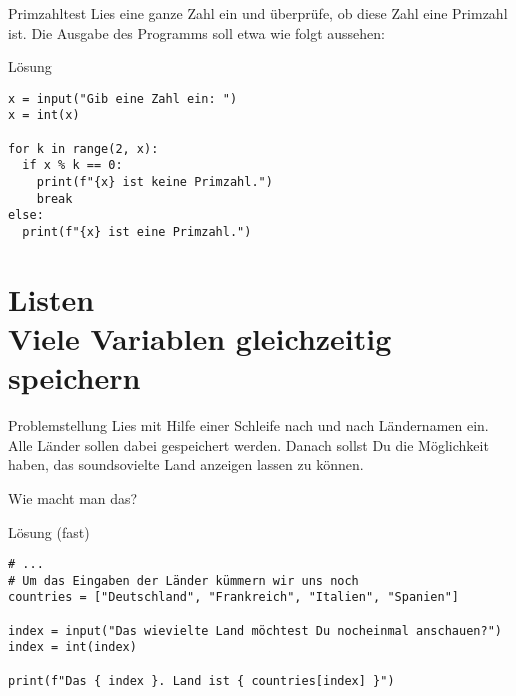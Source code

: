 \begin{fragile}
\begin{block}{Primzahltest}
\vspace{2pt}
Lies eine ganze Zahl  ein und überprüfe, ob diese Zahl eine Primzahl ist. Die Ausgabe des Programms soll etwa wie folgt aussehen:  

\end{block}

\vspace{12pt}
\begin{solutionblock}{Lösung}
\begin{verbatim}
x = input("Gib eine Zahl ein: ")
x = int(x)

for k in range(2, x):
  if x % k == 0:
    print(f"{x} ist keine Primzahl.")
    break
else:
  print(f"{x} ist eine Primzahl.")
\end{verbatim}
\end{solutionblock}

\end{fragile}



\section{Listen \\ \footnotesize Viele Variablen gleichzeitig speichern}


\begin{frame}
\begin{block}{Problemstellung}
\vspace{2pt}
Lies mit Hilfe einer Schleife nach und nach Ländernamen ein. 
Alle Länder sollen dabei gespeichert werden. Danach sollst Du die Möglichkeit haben, das soundsovielte Land anzeigen lassen zu können.   

\vspace{8pt}

Wie macht man das? 
\end{block}
\end{frame}

\begin{fragile}{}
\begin{block}{Lösung \footnotesize(fast)}
\begin{verbatim}
# ...
# Um das Eingaben der Länder kümmern wir uns noch 
countries = ["Deutschland", "Frankreich", "Italien", "Spanien"] 

index = input("Das wievielte Land möchtest Du nocheinmal anschauen?")
index = int(index)

print(f"Das { index }. Land ist { countries[index] }")
\end{verbatim}
\end{block}
\end{fragile}


